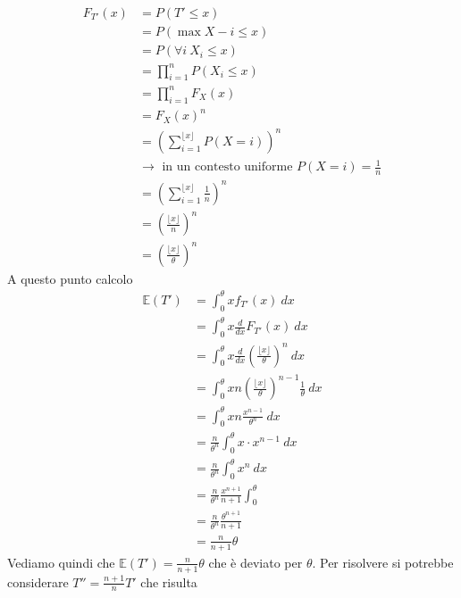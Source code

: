 \documentclass[11pt]{report}
\begin{document}
\begin{equation}
    \begin{split}
        F_{T'}(x) & = P(T' \leq x)\\
        & = P(\max X-i \leq x)\\
        & = P(\forall i\ X_i \leq x)\\
        & = \prod_{i=1}^n P(X_i \leq x)\\
        & = \prod_{i=1}^n F_X(x)\\
        & = F_X(x)^n\\
        & = \left( \sum_{i=1}^{\lfloor x\rfloor} P(X=i) \right)^n\\
        & \rightarrow \text{ in un contesto uniforme } P(X=i) = \frac{1}{n}\\
        & = \left( \sum_{i=1}^{\lfloor x\rfloor} \frac{1}{n} \right)^n\\
        & = \left( \frac{\lfloor x\rfloor}{n} \right)^n\\
        & = \left( \frac{\lfloor x\rfloor}{\theta} \right)^n
    \end{split}
\end{equation}
A questo punto calcolo
\begin{equation}
    \begin{split}
        \mathbb{E}(T') & = \int_0^\theta x f_{T'}(x)\ dx\\
        & = \int_0^\theta x \frac{d}{dx}F_{T'}(x)\ dx\\
        & = \int_0^\theta x \frac{d}{dx}\left( \frac{\lfloor x\rfloor}{\theta} \right)^n\ dx\\
        & = \int_0^\theta x n \left( \frac{\lfloor x\rfloor}{\theta} \right)^{n-1} \frac{1}{\theta}\ dx\\
        & = \int_0^\theta x n\frac{x^{n-1}}{\theta^n}\ dx\\
        & = \frac{n}{\theta^n} \int_0^\theta x \cdot x^{n-1}\ dx\\
        & = \frac{n}{\theta^n} \int_0^\theta x^n\ dx\\
        & = \frac{n}{\theta^n} \frac{x^{n+1}}{n+1} \int_0^\theta\\
        & = \frac{n}{\theta^n} \frac{\theta^{n+1}}{n+1}\\
        & = \frac{n}{n+1} \theta
    \end{split}
\end{equation}
Vediamo quindi che $\mathbb{E}(T') = \frac{n}{n+1} \theta$ che è deviato per $\theta$. Per risolvere si potrebbe considerare $T'' = \frac{n+1}{n} T'$ che risulta
\end{document}
